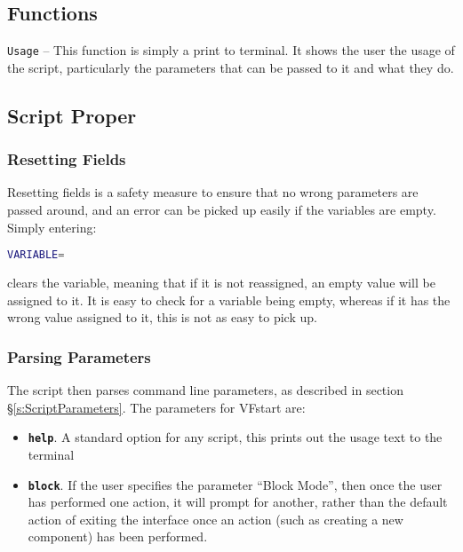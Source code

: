 \documentclass[a4paper, oneside, 11pt, titlepage, onecolumn, openright]{report}
\begin{document}
\subsection{Functions}
			\label{ss:VFstartFunctions}			
			\texttt{Usage} -- This function is simply a print to terminal. It shows the user the usage of the script, particularly the parameters that can be passed to it and what they do. 
			
\subsection{Script Proper}
			\label{ss:VFstartScriptProper}
			
\subsubsection{Resetting Fields}
			\label{sss:VFstartResettingFields}

			Resetting fields is a safety measure to ensure that no wrong parameters are passed around, and an error can be picked up easily if the variables are empty. Simply entering:
			
\begin{lstlisting}[frame=trBL, breaklines=true, language = bash]				
VARIABLE=			
\end{lstlisting}				

clears the variable, meaning that if it is not reassigned, an empty value will be assigned to it. It is easy to check for a variable being empty, whereas if it has the wrong value assigned to it, this is not as easy to pick up.

\subsubsection{Parsing Parameters}
			\label{sss:VFstartPassingParameters}
			The script then parses command line parameters, as described in section \S\ref{s:ScriptParameters}.
			The parameters for VFstart are:
			
\begin{itemize}

\item \texttt{\textbf{help}}. A standard option for any script, this prints out the usage text to the terminal

\item \texttt{\textbf{block}}. If the user specifies the parameter ``Block Mode'', then once the user has performed one action, it will prompt for another, rather than the default action of exiting the interface once an action (such as creating a new component) has been performed.
\end{itemize}
\end{document}
